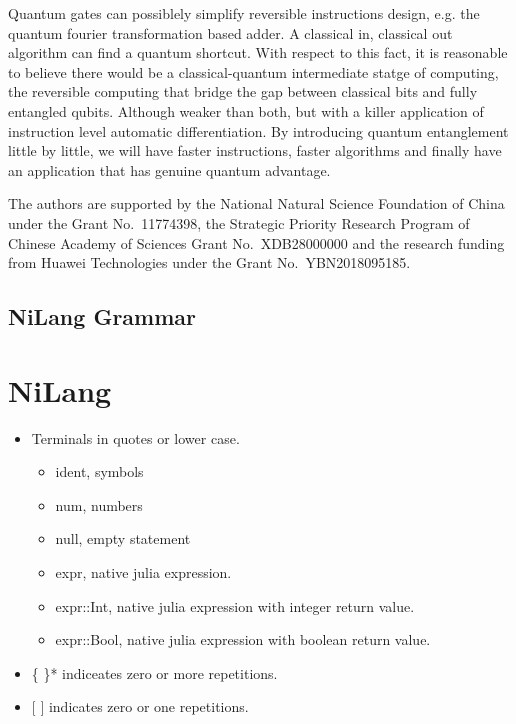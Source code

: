 \documentclass[aps,twocolumn,longbibliography,english,superscriptaddress,prr]{revtex4-1}
\newcommand{\<}{\langle}
\renewcommand{\>}{\rangle}
\begin{document}
Quantum gates can possiblely simplify reversible instructions design, e.g. the quantum fourier transformation based adder.
A classical in, classical out algorithm can find a quantum shortcut.
With respect to this fact, it is reasonable to believe there would be a classical-quantum intermediate statge of computing,
the reversible computing that bridge the gap between classical bits and fully entangled qubits.
Although weaker than both, but with a killer application of instruction level automatic differentiation.
By introducing quantum entanglement little by little, we will have faster instructions, faster algorithms and finally have an application that has genuine quantum advantage.

\begin{acknowledgments}
The authors are supported by the National Natural Science Foundation of China under the Grant No.~11774398, the Strategic Priority Research Program of Chinese Academy of Sciences Grant No.~XDB28000000 and the research funding from Huawei Technologies under the Grant No.~YBN2018095185.
\end{acknowledgments}



\newpage
\appendix
\subsection{NiLang Grammar}

\section{NiLang}\label{app:grammar}
\begin{itemize}
    \item Terminals in quotes or lower case.
    \begin{itemize}
        \item ident, symbols
        \item num, numbers
        \item null, empty statement
        \item expr, native julia expression.
        \item expr::Int, native julia expression with integer return value.
        \item expr::Bool, native julia expression with boolean return value.
    \end{itemize}
    \item \{ \}* indiceates zero or more repetitions.
    \item $[$ $]$  indicates zero or one repetitions.
\end{itemize}
\end{document}
